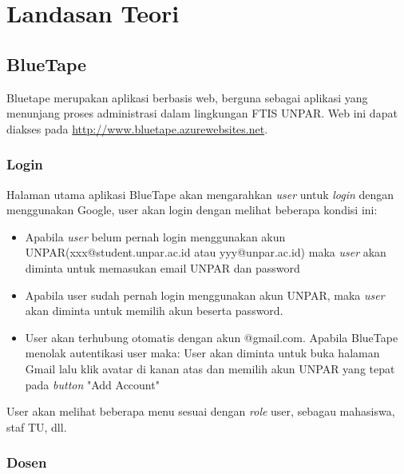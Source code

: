 \chapter{Landasan Teori}
\label{chap:teori}

\section{BlueTape}
\label{sec:bluetape}
Bluetape merupakan aplikasi berbasis web, berguna sebagai aplikasi yang menunjang proses administrasi dalam lingkungan FTIS UNPAR. Web ini dapat diakses pada \url{http://www.bluetape.azurewebsites.net}.

\subsection{Login}
Halaman utama aplikasi BlueTape akan mengarahkan \textit{user} untuk \textit{login} dengan menggunakan Google, user akan login dengan melihat beberapa kondisi ini:
\begin{itemize}
\item Apabila \textit{user} belum pernah login menggunakan akun UNPAR(xxx@student.unpar.ac.id atau yyy@unpar.ac.id) maka  \textit{user} akan diminta untuk memasukan email UNPAR dan password
\item Apabila user sudah pernah login menggunakan akun UNPAR, maka \textit{user} akan diminta untuk memilih akun beserta password.
\item User akan terhubung otomatis dengan akun @gmail.com. Apabila BlueTape menolak autentikasi user maka: User akan diminta untuk buka halaman Gmail lalu klik avatar di kanan atas dan memilih akun UNPAR yang tepat pada \textit{button} "Add Account"
\end{itemize}
User akan melihat beberapa menu sesuai dengan \textit{role} user, sebagau mahasiswa, staf TU, dll.

\subsection{Dosen}
